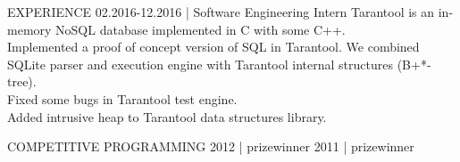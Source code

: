 \documentclass[12pt]{cutecv}
\begin{document}
\begin{paracol}{2}
\begin{rightcolumn}
\begin{cvsection}{EXPERIENCE}
  {02.2016-12.2016 | Software Engineering Intern}
  {Tarantool is an in-memory NoSQL database implemented in C with some C++.\\
   Implemented a proof of concept version of SQL in Tarantool.
   We combined SQLite parser and execution engine with Tarantool internal structures (B+*-tree).\\
   Fixed some bugs in Tarantool test engine.\\
   Added intrusive heap to Tarantool data structures library.}
\end{cvsection}

\begin{cvsection}{COMPETITIVE PROGRAMMING}
  {2012 | prizewinner}
  {}
  {2011 | prizewinner}
  {}
\end{cvsection}

\end{rightcolumn}
\end{paracol}
\end{document}
